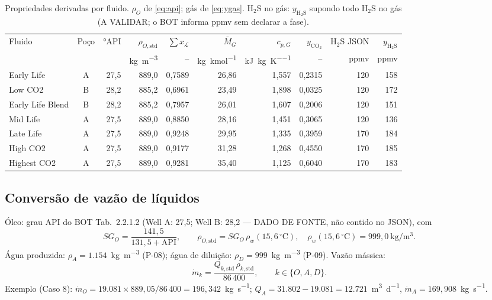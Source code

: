 \documentclass[11pt,a4paper]{article}
\numberwithin{equation}{section}
\numberwithin{table}{section}
\numberwithin{figure}{section}
\newcommand{\tipo}[1]{\textsf{\footnotesize #1}}
\newcommand{\AV}{\textcolor{red!70!black}{\tipo{A VALIDAR}}}
\begin{document}
\begin{table}[htbp]\centering\small
\caption{Propriedades derivadas por fluido. $\rho_O$ de \eqref{eq:api}; gás de \eqref{eq:ygas}. H$_2$S no gás: $y_{\mathrm{H_2S}}$ supondo todo H$_2$S no gás (\AV; o BOT informa ppmv sem declarar a fase).}\label{tab:fluidprops}
\begin{tabular}{lcrrrrrrrr}\toprule
Fluido & Poço & °API & $\rho_{O,\mathrm{std}}$ & $\sum x_{\mathcal L}$ & $\bar M_G$ & $c_{p,G}$ & $y_{\mathrm{CO_2}}$ & H$_2$S JSON & $y_{\mathrm{H_2S}}$\\
 & & & \si{\kilogram\per\cubic\metre} & -- & \si{\kilogram\per\kilo\mole} & \si{\kilo\joule\per\kilogram\per\kelvin} & -- & ppmv & ppmv\\\midrule

Early Life & A & 27{,}5 & 889{,}0 & 0{,}7589 & 26{,}86 & 1{,}557 & 0{,}2315 & 120 & 158\\
Low CO2 & B & 28{,}2 & 885{,}2 & 0{,}6961 & 23{,}49 & 1{,}898 & 0{,}0325 & 120 & 172\\
Early Life Blend & B & 28{,}2 & 885{,}2 & 0{,}7957 & 26{,}01 & 1{,}607 & 0{,}2006 & 120 & 151\\
Mid Life & A & 27{,}5 & 889{,}0 & 0{,}8850 & 28{,}16 & 1{,}451 & 0{,}3065 & 120 & 136\\
Late Life & A & 27{,}5 & 889{,}0 & 0{,}9248 & 29{,}95 & 1{,}335 & 0{,}3959 & 170 & 184\\
High CO2 & A & 27{,}5 & 889{,}0 & 0{,}9177 & 31{,}28 & 1{,}268 & 0{,}4550 & 170 & 185\\
Highest CO2 & A & 27{,}5 & 889{,}0 & 0{,}9281 & 35{,}40 & 1{,}125 & 0{,}6040 & 170 & 183\\
\bottomrule\end{tabular}\end{table}

\subsection{Conversão de vazão de líquidos}
Óleo: grau API do BOT Tab.~2.2.1.2 (Well A: 27,5; Well B: 28,2 --- \tipo{DADO DE FONTE}, não contido no JSON), com
\begin{equation}\label{eq:api}
SG_O=\frac{141{,}5}{131{,}5+\mathrm{API}},\qquad \rho_{O,\mathrm{std}}=SG_O\,\rho_{w}(15{,}6\,^\circ\mathrm{C}),\quad \rho_w(15{,}6\,^\circ\mathrm{C})=999{,}0\ \si{\kilogram\per\cubic\metre}.
\end{equation}
Água produzida: $\rho_{A}=1.154$~\si{\kilogram\per\cubic\metre} (P-08); água de diluição: $\rho_{D}=999$~\si{\kilogram\per\cubic\metre} (P-09). Vazão mássica:
\begin{equation}\label{eq:mliq}
\dot m_k = \frac{Q_{k,\mathrm{std}}\,\rho_{k,\mathrm{std}}}{86\,400},\qquad k\in\{O,A,D\}.
\end{equation}
Exemplo (Caso 8): $\dot m_O = 19.081\times889{,}05/86\,400 = 196{,}342$~\si{\kilogram\per\second}; $Q_A=31.802-19.081=12.721$~\si{\cubic\metre\per\day}, $\dot m_A=169{,}908$~\si{\kilogram\per\second}.
\end{document}
